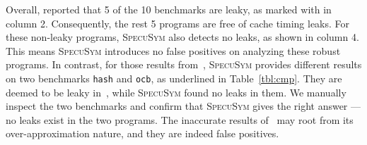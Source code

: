 \documentclass[sigconf]{acmart}
\newcommand{\SpecuSym}{\textsc{SpecuSym} }
\begin{document}
\begin{table}
\caption{Comparison betwee Wu et al.~\cite{WuW19} and \SpecuSym}
\label{tbl:cmp}
\centering
{}
\end{table}




Overall, \cite{WuW19} reported that 5 of the 10 benchmarks are leaky, as marked 
with  in column 2. Consequently, the rest 5 programs are free of cache
timing leaks. For these non-leaky programs, \SpecuSym also detects no leaks, as 
shown in column 4. This means \SpecuSym introduces no false positives on analyzing 
these robust programs. In contrast, for those  results from~\cite{WuW19}, 
\SpecuSym provides different results on two benchmarks \texttt{hash} and \texttt{ocb}, 
as underlined in Table~\ref{tbl:cmp}. They are deemed to be leaky in~\cite{WuW19},
while \SpecuSym found no leaks in them. We manually inspect the two benchmarks and 
confirm that \SpecuSym gives the right answer --- no leaks exist in the two programs. 
The inaccurate results of~\cite{WuW19} may root from its over-approximation nature,
and they are indeed false positives.
\end{document}
